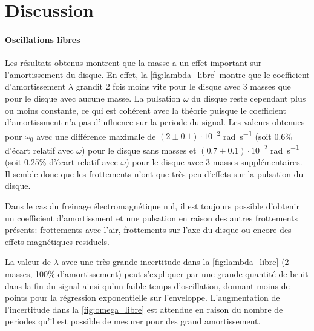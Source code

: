 \section{Discussion}

\paragraph{Oscillations libres}
Les résultats obtenus montrent que la masse a un effet important sur l'amortissement du disque. En effet, la \autoref{fig:lambda_libre} montre que le coefficient d'amortissement \(\lambda\) grandit 2 fois moins vite pour le disque avec 3 masses que pour le disque avec aucune masse. La pulsation \(\omega\) du disque reste cependant plus ou moins constante, ce qui est cohérent avec la théorie puisque le coefficient d'amortissment n'a pas d'influence sur la periode du signal. Les valeurs obtenues pour \(\omega_0\) avec une différence maximale de \((2 \pm 0.1) \cdot 10^{-2}\) \si{\radian\per\second} (soit 0.6\% d'écart relatif avec \(\omega\)) pour le disque sans masses et \((0.7 \pm 0.1) \cdot 10^{-2}\) \si{\radian\per\second} (soit 0.25\% d'écart relatif avec \(\omega\)) pour le disque avec 3 masses supplémentaires. Il semble donc que les frottements n'ont que très peu d'effets sur la pulsation du disque.

Dans le cas du freinage électromagnétique nul, il est toujours possible d'obtenir un coefficient d'amortissment et une pulsation en raison des autres frottements présents: frottements avec l'air, frottements sur l'axe du disque ou encore des effets magnétiques residuels.

La valeur de \(\lambda\) avec une très grande incertitude dans la \autoref{fig:lambda_libre} (2 masses, 100\% d'amortissement) peut s'expliquer par une grande quantité de bruit dans la fin du signal ainsi qu'un faible temps d'oscillation, donnant moins de points pour la régression exponentielle sur l'enveloppe. L'augmentation de l'incertitude dans la \autoref{fig:omega_libre} est attendue en raison du nombre de periodes qu'il est possible de mesurer pour des grand amortissement.